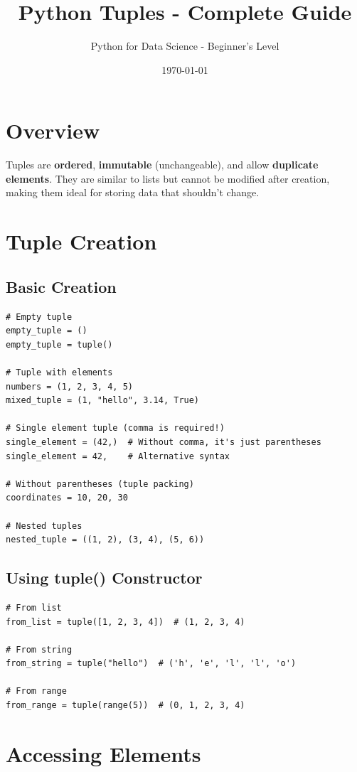 \documentclass[12pt,a4paper]{article}
\title{\textbf{Python Tuples - Complete Guide}}
\author{Python for Data Science - Beginner's Level}
\date{\today}
\begin{document}
\maketitle
\tableofcontents
\newpage

\section{Overview}

Tuples are \textbf{ordered}, \textbf{immutable} (unchangeable), and allow \textbf{duplicate elements}. They are similar to lists but cannot be modified after creation, making them ideal for storing data that shouldn't change.

\section{Tuple Creation}

\subsection{Basic Creation}

\begin{lstlisting}
# Empty tuple
empty_tuple = ()
empty_tuple = tuple()

# Tuple with elements
numbers = (1, 2, 3, 4, 5)
mixed_tuple = (1, "hello", 3.14, True)

# Single element tuple (comma is required!)
single_element = (42,)  # Without comma, it's just parentheses
single_element = 42,    # Alternative syntax

# Without parentheses (tuple packing)
coordinates = 10, 20, 30

# Nested tuples
nested_tuple = ((1, 2), (3, 4), (5, 6))
\end{lstlisting}

\subsection{Using tuple() Constructor}

\begin{lstlisting}
# From list
from_list = tuple([1, 2, 3, 4])  # (1, 2, 3, 4)

# From string
from_string = tuple("hello")  # ('h', 'e', 'l', 'l', 'o')

# From range
from_range = tuple(range(5))  # (0, 1, 2, 3, 4)
\end{lstlisting}

\section{Accessing Elements}
\end{document}
